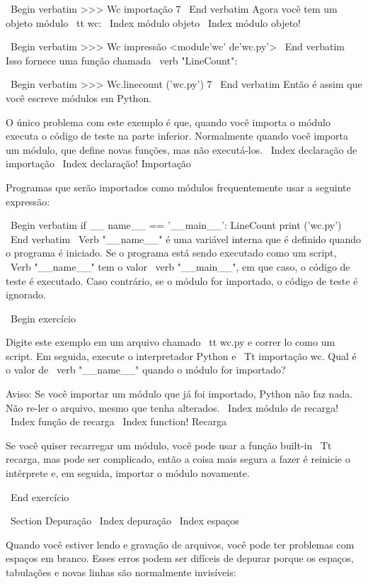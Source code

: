 \documentclass[10pt]{book}
\begin{document}
\begin {itemize}
{{{{{{{{{{{\ Begin {verbatim}
>>> Wc importação
7
\ End {verbatim}
%
Agora você tem um objeto módulo {\ tt wc}:
\ Index {módulo objeto}
\ Index {módulo objeto!}

\ Begin {verbatim}
>>> Wc impressão
<module'wc' de'wc.py'>
\ End {verbatim}
%
Isso fornece uma função chamada \ verb "LineCount":

\ Begin {verbatim}
>>> Wc.linecount ('wc.py')
7
\ End {verbatim}
%
Então é assim que você escreve módulos em Python.

O único problema com este exemplo é que, quando você importa
o módulo executa o código de teste na parte inferior. Normalmente
quando você importa um módulo, que define novas funções, mas
não executá-los.
\ Index {declaração de importação}
\ Index {declaração! Importação}

Programas que serão importados como módulos frequentemente
usar a seguinte expressão:

\ Begin {verbatim}
if __ name__ == '__main__':
    LineCount print ('wc.py')
\ End {verbatim}
%
\ Verb "__name__" é uma variável interna que é definido quando o
programa é iniciado. Se o programa está sendo executado como um script,
\ Verb "__name__" tem o valor \ verb "__main__", em que
caso, o código de teste é executado. Caso contrário,
se o módulo for importado, o código de teste é ignorado.

\ Begin {} exercício

Digite este exemplo em um arquivo chamado {\ tt wc.py} e correr
lo como um script. Em seguida, execute o interpretador Python e
{\ Tt importação wc}. Qual é o valor de \ verb "__name__"
quando o módulo for importado?

Aviso: Se você importar um módulo que já foi importado,
Python não faz nada. Não re-ler o arquivo, mesmo que tenha
alterados.
\ Index {módulo de recarga!}
\ Index {função de recarga}
\ Index {function! Recarga}

Se você quiser recarregar um módulo, você pode usar a função built-in 
{\ Tt recarga}, mas pode ser complicado, então a coisa mais segura a fazer é
reinicie o intérprete e, em seguida, importar o módulo novamente.

\ End {} exercício



\ Section {} Depuração
\ Index {depuração}
\ Index {espaços}

Quando você estiver lendo e gravação de arquivos, você pode ter problemas
com espaços em branco. Esses erros podem ser difíceis de depurar porque os espaços,
tabulações e novas linhas são normalmente invisíveis:

}}}}}}}}}}}
\end{itemize}
\end{document}
